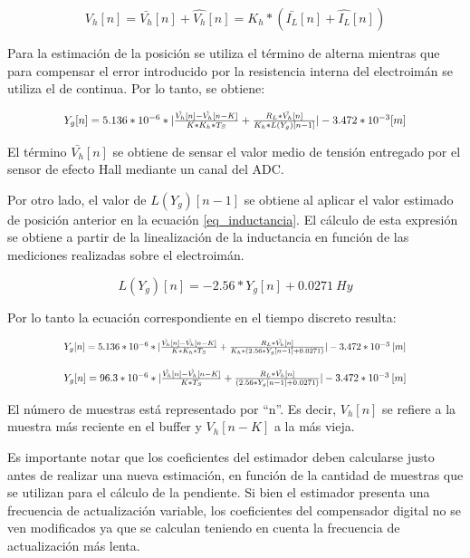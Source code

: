 \begin{equation} 
	V_h[n] = \bar{V_h}[n] + \hat{V_h}[n] = K_h * (\bar{I_L}[n] + \hat{I_L}[n])
\end{equation}

\noindent Para la estimación de la posición se utiliza el término de alterna mientras que para compensar el error introducido por la resistencia interna del electroimán se utiliza el de continua. Por lo tanto, se obtiene:

\begin{equation}
	\resizebox{.8\hsize}{!}
	{
	$Y_g[n] = 5.136*10^{-6}*|\frac{\hat{V_h}[n]-\hat{V_h}[n-K]}{K*K_h*T_S} + \frac{R_L*\bar{V_h}[n]}{K_h*L(Y_g)[n-1]}|-3.472*10^{-3}[m]$
	}
\end{equation}

\noindent El término $\bar{V_h}[n]$ se obtiene de sensar el valor medio de tensión entregado por el sensor de efecto Hall mediante un canal del ADC.

\noindent Por otro lado, el valor de $L(Y_g)[n-1]$ se obtiene al aplicar el valor estimado de posición anterior en la ecuación \ref{eq_inductancia}. El cálculo de esta expresión se obtiene a partir de la linealización de la inductancia en función de las mediciones realizadas sobre el electroimán.


\begin{equation} \label{eq_inductancia}
	L(Y_g)[n] = -2.56*Y_g[n]+0.0271\:Hy
\end{equation}

\noindent Por lo tanto la ecuación correspondiente en el tiempo discreto resulta:

\begin{equation}
	\resizebox{.8\hsize}{!}
	{
	$Y_g[n] = 5.136*10^{-6}*|\frac{\hat{V_h}[n]-\hat{V_h}[n-K]}{K*K_h*T_S} + \frac{R_L*\bar{V_h}[n]}{K_h*(2.56*Y_g[n-1]+0.0271)}|-3.472*10^{-3}\:[m]$
	}
\end{equation}

\begin{equation}
	\resizebox{.8\hsize}{!}
	{
	$
	Y_g[n] = 96.3*10^{-6}*|\frac{\hat{V_h}[n]-\hat{V_h}[n-K]}{K*T_S} + \frac{R_L*\bar{V_h}[n]}{(2.56*Y_g[n-1]+0.0271)}|-3.472*10^{-3}\:[m]
	$
	}
\end{equation}


\noindent El número de muestras está representado por ``n''. Es decir, $V_h[n]$ se refiere a la muestra más reciente en el buffer y $V_h[n-K]$ a la más vieja.

Es importante notar que los coeficientes del estimador deben calcularse justo antes de realizar una nueva estimación,  en función de la cantidad de muestras que se utilizan para el cálculo de la pendiente. Si bien el estimador presenta una frecuencia de actualización variable, los coeficientes del compensador digital no se ven modificados ya que se calculan teniendo en cuenta la frecuencia de actualización más lenta.

